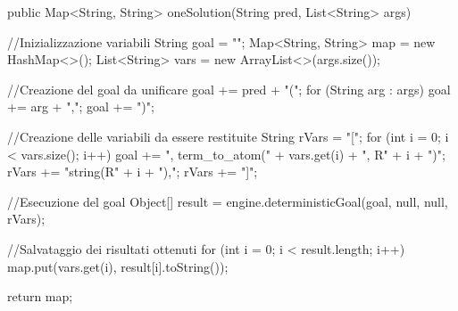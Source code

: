 \begin{javacode}
   public Map<String, String> oneSolution(String pred, List<String> args){
   
   //Inizializzazione variabili
     String goal = "";
     Map<String, String> map = new HashMap<>();
     List<String> vars = new ArrayList<>(args.size());

   //Creazione del goal da unificare
     goal += pred + "(";
     for (String arg : args)
       goal += arg + ",";
     goal += ")";
       
   //Creazione delle variabili da essere restituite
     String rVars = "[";
     for (int i = 0; i < vars.size(); i++) {
       goal += ", term_to_atom(" + vars.get(i) + ", R" + i + ")";
       rVars += "string(R" + i + "),";
     }
     rVars += "]";

   //Esecuzione del goal
     Object[] result = engine.deterministicGoal(goal, null, null, rVars);
     
   //Salvataggio dei risultati ottenuti
     for (int i = 0; i < result.length; i++) {
       map.put(vars.get(i), result[i].toString());
     }
      
     return map;
   }
\end{javacode}
\clearpage